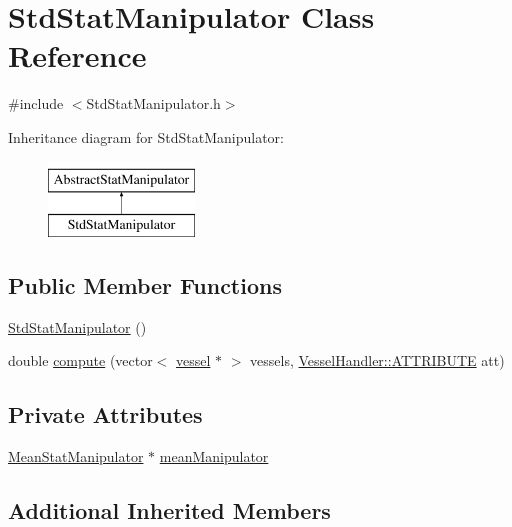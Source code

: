 \hypertarget{class_std_stat_manipulator}{}\section{Std\+Stat\+Manipulator Class Reference}
\label{class_std_stat_manipulator}


{\ttfamily \#include $<$Std\+Stat\+Manipulator.\+h$>$}

Inheritance diagram for Std\+Stat\+Manipulator\+:\begin{figure}[H]
\begin{center}
\leavevmode
\includegraphics[height=2.000000cm]{d6/d5c/class_std_stat_manipulator}
\end{center}
\end{figure}
\subsection*{Public Member Functions}
\begin{DoxyCompactItemize}
\item 
\hyperlink{class_std_stat_manipulator_a9964b2c7f0912fec9f0671196594eafc}{Std\+Stat\+Manipulator} ()
\item 
double \hyperlink{class_std_stat_manipulator_a8b09c42b54d14322e805d153d8dfc028}{compute} (vector$<$ \hyperlink{structvessel}{vessel} $\ast$ $>$ vessels, \hyperlink{class_vessel_handler_a6cc775e9a5bcbe69ef381f56b52982e7}{Vessel\+Handler\+::\+A\+T\+T\+R\+I\+B\+U\+TE} att)
\end{DoxyCompactItemize}
\subsection*{Private Attributes}
\begin{DoxyCompactItemize}
\item 
\hyperlink{class_mean_stat_manipulator}{Mean\+Stat\+Manipulator} $\ast$ \hyperlink{class_std_stat_manipulator_aa14f0467d5a1ce40bfd78b3d39db54a1}{mean\+Manipulator}
\end{DoxyCompactItemize}
\subsection*{Additional Inherited Members}


